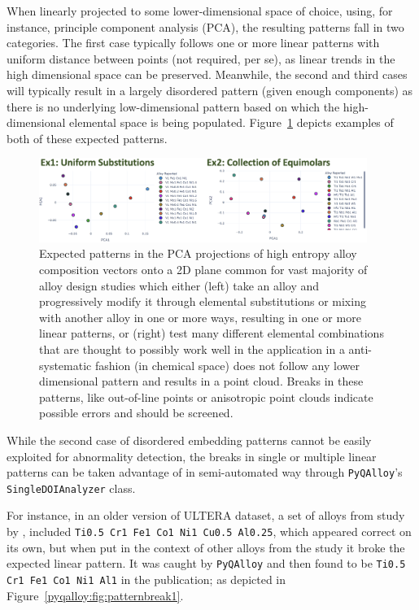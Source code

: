 When linearly projected to some lower-dimensional space of choice, using, for instance, principle component analysis (PCA), the resulting patterns fall in two categories. The first case typically follows one or more linear patterns with uniform distance between points (not required, per se), as linear trends in the high dimensional space can be preserved. Meanwhile, the second and third cases will typically result in a largely disordered pattern (given enough components) as there is no underlying low-dimensional pattern based on which the high-dimensional elemental space is being populated. Figure~\ref{pyqalloy:fig:expectedpatterns} depicts examples of both of these expected patterns.

\begin{figure}[H]
    \centering
    \includegraphics[width=0.95\textwidth]{pyqalloy/pyqalloy_ExpectedPCAPatterns.png}
    \caption{Expected patterns in the PCA projections of high entropy alloy composition vectors onto a 2D plane common for vast majority of alloy design studies which either (left) take an alloy and progressively modify it through elemental substitutions or mixing with another alloy in one or more ways, resulting in one or more linear patterns, or (right) test many different elemental combinations that are thought to possibly work well in the application in a anti-systematic fashion (in chemical space) does not follow any lower dimensional pattern and results in a point cloud. Breaks in these patterns, like out-of-line points or anisotropic point clouds indicate possible errors and should be screened.}
    \label{pyqalloy:fig:expectedpatterns}
\end{figure}

While the second case of disordered embedding patterns cannot be easily exploited for abnormality detection, the breaks in single or multiple linear patterns can be taken advantage of in semi-automated way through \texttt{PyQAlloy}'s \texttt{SingleDOIAnalyzer} class.

For instance, in an older version of ULTERA dataset, a set of alloys from study by \citet{Wang2009AtomicAlloy}, included \texttt{Ti0.5 Cr1 Fe1 Co1 Ni1 Cu0.5 Al0.25}, which appeared correct on its own, but when put in the context of other alloys from the study it broke the expected linear pattern. It was caught by \texttt{PyQAlloy} and then found to be \texttt{Ti0.5 Cr1 Fe1 Co1 Ni1 Al1} in the publication; as depicted in Figure~\ref{pyqalloy:fig:patternbreak1}.



